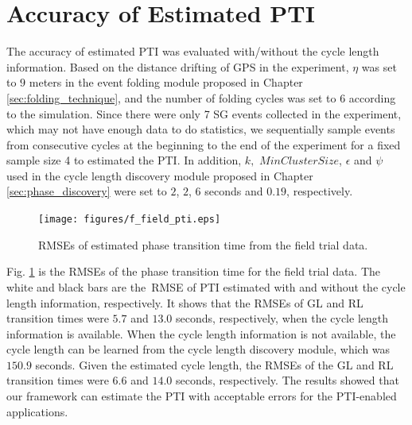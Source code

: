 \documentclass[final,oneside,onecolumn,12pt,a4paper]{book}%
\begin{document}
\section{Accuracy of Estimated PTI}

The accuracy of estimated PTI was evaluated with/without the cycle length
information. Based on the distance drifting of GPS in the experiment, $\eta$
was set to $9$ meters in the event folding module proposed in Chapter
\ref{sec:folding_technique}, and the number of folding cycles was set to $6$
according to the simulation. Since there were only 7 SG events collected in
the experiment, which may not have enough data to do statistics, we
sequentially sample events from consecutive cycles at the beginning to the end
of the experiment for a fixed sample size 4 to estimated the PTI. In addition,
$k,$ $MinClusterSize$, $\epsilon$ and $\psi$ used in the cycle length
discovery module proposed in Chapter \ref{sec:phase_discovery} were set to
$2$, $2$, $6$ seconds and $0.19$, respectively.\begin{figure}[th]
\centerline{\texttt{[image: figures/f\_field\_pti.eps]}} \hfill\caption{RMSEs of estimated phase transition
time from the field trial data.}%
\label{fig:f_field_pti}%
\end{figure}

Fig. \ref{fig:f_field_pti} is the RMSEs of the phase transition time for the
field trial data. The white and black bars are the\ RMSE of PTI estimated with
and without the cycle length information, respectively. It shows that the
RMSEs of GL and RL transition times were $5.7$ and $13.0$ seconds,
respectively, when the cycle length information is available. When the cycle
length information is not available, the cycle length can be learned from the
cycle length discovery module, which was $150.9$ seconds. Given the estimated
cycle length, the RMSEs of the GL and RL transition times were $6.6$ and
$14.0$ seconds, respectively. The results showed that our framework can
estimate the PTI with acceptable errors for the PTI-enabled applications.
\end{document}

